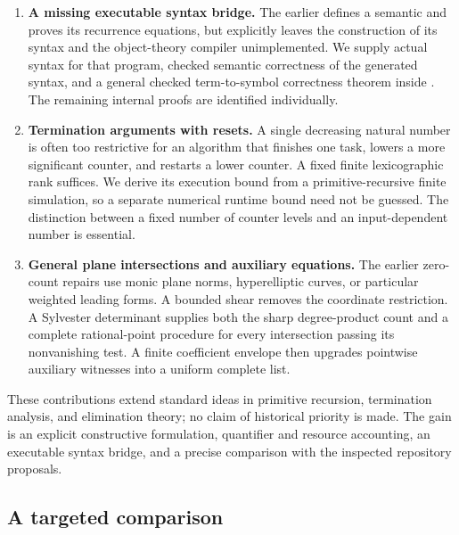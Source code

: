 \begin{enumerate}
\item \textbf{A missing executable syntax bridge.}
The earlier  defines a semantic
 and proves its recurrence equations, but explicitly
leaves the construction of its  syntax and the object-theory
compiler unimplemented. We supply actual syntax for that program, checked
semantic correctness of the generated syntax, and a general checked
term-to-symbol correctness theorem inside . The remaining
internal proofs are identified individually.
\item \textbf{Termination arguments with resets.}
A single decreasing natural number is often too restrictive for an
algorithm that finishes one task, lowers a more significant counter, and
restarts a lower counter. A fixed finite lexicographic rank suffices. We
derive its execution bound from a primitive-recursive finite simulation,
so a separate numerical runtime bound need not be guessed. The distinction
between a fixed number of counter levels and an input-dependent number is
essential.
\item \textbf{General plane intersections and auxiliary equations.}
The earlier zero-count repairs use monic plane norms, hyperelliptic
curves, or particular weighted leading forms. A bounded shear removes the
coordinate restriction. A Sylvester determinant supplies both the sharp
degree-product count and a complete rational-point procedure for every
intersection passing its nonvanishing test. A finite coefficient envelope
then upgrades pointwise auxiliary witnesses into a uniform complete list.
\end{enumerate}

These contributions extend standard ideas in primitive recursion,
termination analysis, and elimination theory; no claim of historical
priority is made. The gain is an explicit constructive formulation,
quantifier and resource accounting, an executable syntax bridge, and a
precise comparison with the inspected repository proposals.

\subsection{A targeted comparison}

